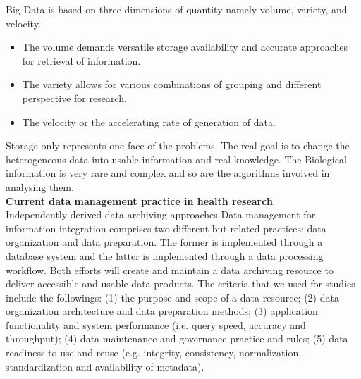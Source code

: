 \documentclass[10pt,a4paper,twoside]{article}
\begin{document}
Big Data is based on three dimensions of quantity namely volume, variety, and velocity.
\begin{itemize}
 \item The volume demands versatile storage availability and accurate approaches for retrieval of information.
 \item The variety allows for various combinations of grouping and different perspective for research.
 \item The velocity or the accelerating rate of generation of data.
\end{itemize}

Storage only represents one face of the problems. The real goal is to change the heterogeneous data into usable information and real knowledge. The Biological information is very rare and complex and so are the algorithms involved in analysing them. \\

\textbf{Current data management practice in health research}\\
Independently derived data archiving approaches Data management for information integration comprises two different but related practices: data organization and data preparation. The former is implemented through a database system and the latter is implemented through a data processing workflow. Both efforts will create and maintain a data archiving resource to deliver accessible and usable data products. The criteria that we used for studies include the followings: (1) the purpose and scope of a data resource; (2) data organization architecture and data preparation methods; (3) application functionality and system performance (i.e. query speed, accuracy and throughput); (4) data maintenance and governance practice and rules; (5) data readiness to use and reuse (e.g. integrity, consistency, normalization, standardization and availability of metadata). 
\end{document}
